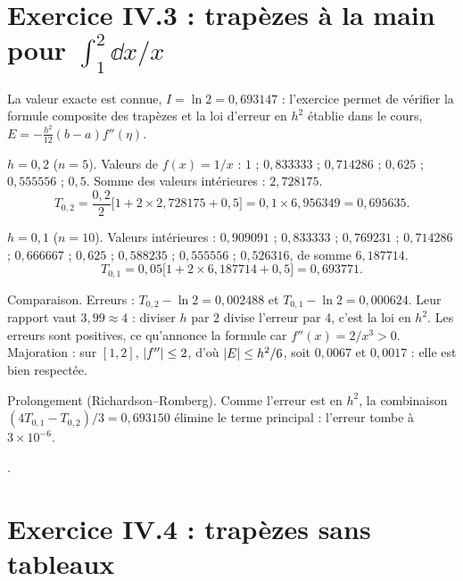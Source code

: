 \section{\texorpdfstring{Exercice IV.3 : trapèzes à la main pour $\int_1^2 \dd x/x$}{Exercice IV.3 : trapèzes à la main pour l'intégrale de 1/x}}


\Pourquoi La valeur exacte est connue, $I = \ln 2 = 0{,}693147$ : l'exercice
permet de vérifier la formule composite des trapèzes et la loi d'erreur en
$h^2$ établie dans le cours, $E = -\tfrac{h^2}{12}(b-a)f''(\eta)$.

\Etapes
{} $h = 0{,}2$ ($n = 5$). Valeurs de $f(x) = 1/x$ :
$1$ ; $0{,}833333$ ; $0{,}714286$ ; $0{,}625$ ; $0{,}555556$ ; $0{,}5$. Somme
des valeurs intérieures : $2{,}728175$.
\[
  T_{0,2} = \frac{0{,}2}{2}\bigl[1 + 2 \times 2{,}728175 + 0{,}5\bigr]
          = 0{,}1 \times 6{,}956349 = 0{,}695635 .
\]

 $h = 0{,}1$ ($n = 10$). Valeurs intérieures : $0{,}909091$ ;
$0{,}833333$ ; $0{,}769231$ ; $0{,}714286$ ; $0{,}666667$ ; $0{,}625$ ;
$0{,}588235$ ; $0{,}555556$ ; $0{,}526316$, de somme $6{,}187714$.
\[
  T_{0,1} = 0{,}05\bigl[1 + 2 \times 6{,}187714 + 0{,}5\bigr] = 0{,}693771 .
\]

 Comparaison. Erreurs : $T_{0,2} - \ln 2 = 0{,}002488$ et
$T_{0,1} - \ln 2 = 0{,}000624$. Leur rapport vaut $3{,}99 \approx 4$ : diviser
$h$ par 2 divise l'erreur par 4, c'est la loi en $h^2$. Les erreurs sont
positives, ce qu'annonce la formule car $f''(x) = 2/x^3 > 0$. Majoration : sur
$[1,2]$, $\left|f''\right| \le 2$, d'où $\left|E\right| \le h^2/6$, soit $0{,}0067$ et
$0{,}0017$ : elle est bien respectée.

 Prolongement (Richardson--Romberg). Comme l'erreur est en $h^2$, la
combinaison $(4T_{0,1} - T_{0,2})/3 = 0{,}693150$ élimine le terme principal :
l'erreur tombe à $3\times 10^{-6}$.

\Refs {}.

\section{Exercice IV.4 : trapèzes sans tableaux}


